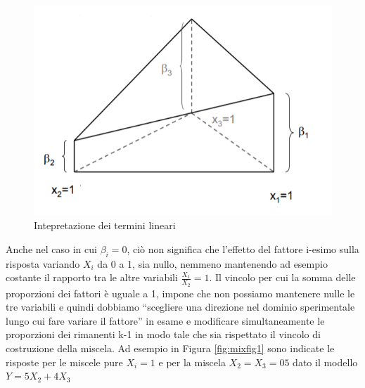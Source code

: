 \documentclass[
  11pt,
]{book}
\begin{document}
\begin{figure}[ht]

{\centering \includegraphics[width=1\linewidth]{Immagini/Mixt/02_coeff_lin} 

}

\caption{Intepretazione dei termini lineari}\label{fig:mixfig2}
\end{figure}

Anche nel caso in cui \(\beta_i=0\), ciò non significa che l'effetto del fattore i-esimo sulla risposta variando \(X_i\) da 0 a 1, sia nullo, nemmeno mantenendo ad esempio costante il rapporto tra le altre variabili \(\frac{X_1}{X_2}=1\). Il vincolo per cui la somma delle proporzioni dei fattori è uguale a 1, impone che non possiamo mantenere nulle le tre variabili e quindi dobbiamo ``scegliere una direzione nel dominio sperimentale lungo cui fare variare il fattore'' in esame e modificare simultaneamente le proporzioni dei rimanenti k-1 in modo tale che sia rispettato il vincolo di costruzione della miscela. Ad esempio in Figura \ref{fig:mixfig1} sono indicate le risposte per le miscele pure \(X_i=1\) e per la miscela \(X_2=X_3=05\) dato il modello \(Y=5X_2+4X_3\)
\end{document}
